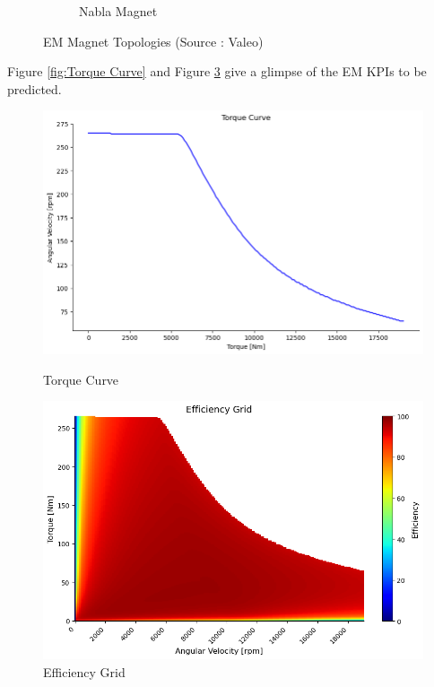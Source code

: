 \documentclass{report} %
\begin{document}
\begin{figure}[H]
\begin{subfigure}{0.32\textwidth}
        \caption{Nabla Magnet}
        \label{fig:Nabla Magnet}
    \end{subfigure}
    \caption{\ac{EM} Magnet Topologies (Source : Valeo)}
    \label{fig:EM Magnet Topologies}
\end{figure}

Figure \ref{fig:Torque Curve} and Figure \ref{fig:Efficiency Grid} give a glimpse of the \ac{EM} \ac{KPI}s to be predicted. \\
\begin{figure}[H]
    \centering
    \begin{minipage}[b]{0.475\textwidth}
        \centering
        \includegraphics[width=\textwidth]{./ReportImages/TorqueCurve.png}
        \caption{Torque Curve} %
        \label{fig:Torque Curve}
    \end{minipage}
    \hfill
    \begin{minipage}[b]{0.475\textwidth}
        \centering
        \includegraphics[width=\textwidth]{./ReportImages/EfficiencyGrid.png}
        \caption{Efficiency Grid}
        \label{fig:Efficiency Grid}
    \end{minipage}
\end{figure}
\end{document}
